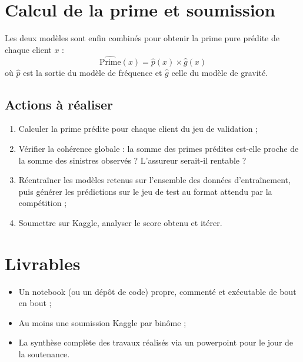 \documentclass[a4paper,11pt]{article}
\begin{document}
	\section{Calcul de la prime et soumission}
	
	Les deux modèles sont enfin combinés pour obtenir la prime pure prédite de chaque client $x$ :
	\[
	\widehat{\text{Prime}}(x) = \hat{p}(x) \times \hat{g}(x)
	\]
	où $\hat{p}$ est la sortie du modèle de fréquence et $\hat{g}$ celle du modèle de gravité.
	
	\subsection*{Actions à réaliser}
	\begin{enumerate}
		\item Calculer la prime prédite pour chaque client du jeu de validation ;
		\item Vérifier la cohérence globale : la somme des primes prédites est-elle proche de la somme des sinistres observés ? L'assureur serait-il rentable ?
		\item Réentraîner les modèles retenus sur l'ensemble des données d'entraînement, puis générer les prédictions sur le jeu de test au format attendu par la compétition ;
		\item Soumettre sur Kaggle, analyser le score obtenu et itérer.
	\end{enumerate}
	
	\section*{Livrables}
	\begin{itemize}
		\item Un notebook (ou un dépôt de code) propre, commenté et exécutable de bout en bout ;
		\item Au moins une soumission Kaggle par binôme ;
		\item La synthèse complète des travaux réalisés via un powerpoint pour le jour de la soutenance.
	\end{itemize}
	
\end{document}
